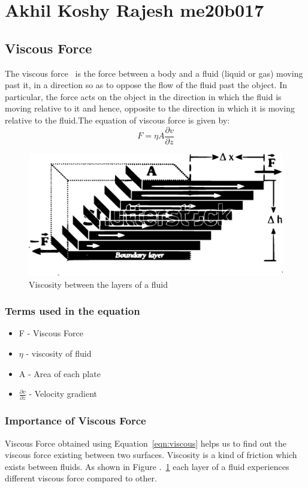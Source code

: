 \section{Akhil Koshy Rajesh me20b017}
\subsection{Viscous Force}

The viscous force~\cite{zhang} is the force between a body and a fluid (liquid or gas) 
moving past it, in a direction so as to oppose the flow of the fluid past 
the object. In particular, the force acts on the object in the direction in 
which the fluid is moving relative to it and hence, opposite to the 
direction in which it is moving relative to the fluid.The equation of 
viscous force is given by: 
\begin{equation}
F = \eta A \frac{\partial v}{\partial z}
\label{eqn:viscous}
\end{equation}
\begin{figure}[h]
	\begin{center}
		  \includegraphics[scale=0.6]{me20b017.eps}
	\end{center}
\caption{Viscosity between the layers of a fluid}
\label{fig:viscous}
\end{figure}

\subsubsection{Terms used in the equation}
\begin{itemize}
	\item F - Viscous Force
	\item $\eta$ - viscosity of fluid
	\item A - Area of each plate
	\item $\frac{\partial v}{\partial z}$ - Velocity gradient 
\end{itemize}

\subsubsection{Importance of Viscous Force}
Viscous Force obtained using Equation~\ref{eqn:viscous} helps us to find 
out the viscous force existing between two surfaces. Viscosity is a kind 
of friction which exists between fluids. As shown in Figure .~\ref{fig:viscous}
each layer of a fluid experiences different viscous force compared to 
other.
